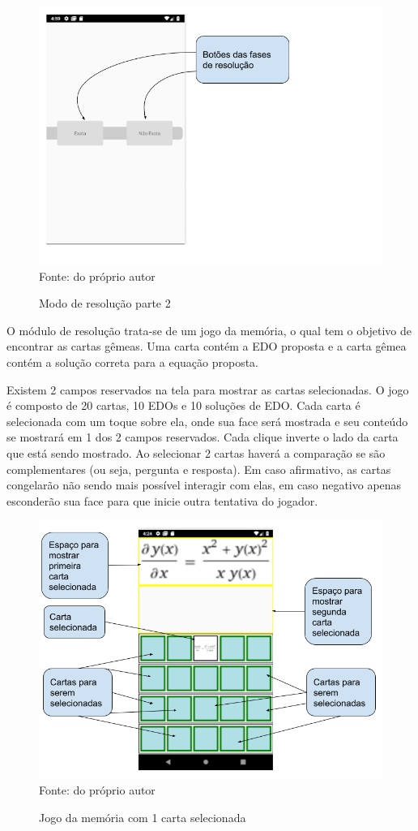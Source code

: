 \begin{figure}[H]
\centering
\caption{Modo de resolução parte 2}
\includegraphics[scale=0.72]{figuras/modo_resolucao_2.png}
\small{Fonte: do próprio autor}
\end{figure}


O módulo de resolução trata-se de um jogo da memória, o qual tem o objetivo de encontrar as cartas gêmeas. Uma carta contém a EDO proposta e a carta gêmea contém a solução correta para a equação proposta.

Existem 2 campos reservados na tela para mostrar as cartas selecionadas. O jogo é composto de 20 cartas, 10 EDOs e 10 soluções de EDO. Cada carta é selecionada com um toque sobre ela, onde sua face será mostrada e seu conteúdo se mostrará em 1 dos 2 campos reservados. Cada clique inverte o lado da carta que está sendo mostrado. Ao selecionar 2 cartas haverá a comparação se são complementares (ou seja, pergunta e resposta). Em caso afirmativo, as cartas congelarão não sendo mais possível interagir com elas, em caso negativo apenas esconderão sua face para que inicie outra tentativa do jogador.

\begin{figure}[H]
\centering
\caption{Jogo da memória com 1 carta selecionada}
\includegraphics[scale=0.72]{figuras/resolucao_1imagem.png}
\small{Fonte: do próprio autor}
\end{figure}

